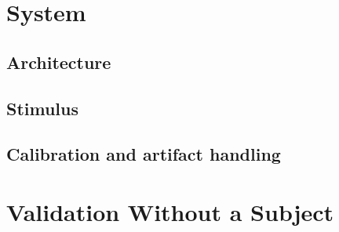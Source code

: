 \documentclass[conference]{IEEEtran}
\begin{document}
\section{System}
\subsection{Architecture}
\subsection{Stimulus}
\subsection{Calibration and artifact handling}

\section{Validation Without a Subject}
\end{document}
